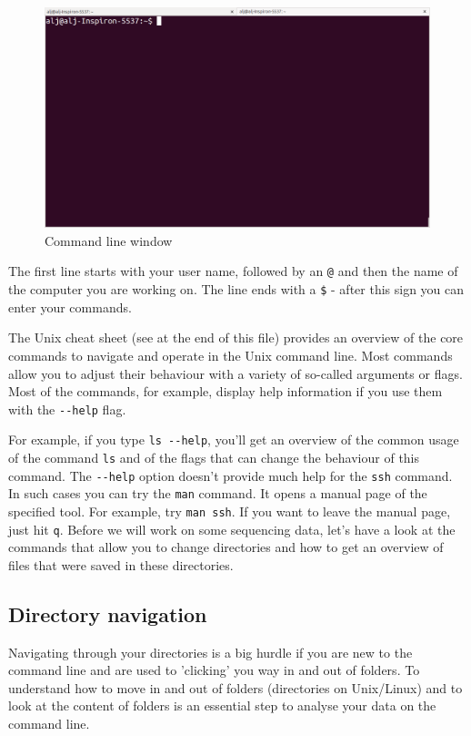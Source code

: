 \documentclass[11pt]{article}
\begin{document}
\begin{figure}[htb]
\centering
\includegraphics[width=14cm]{Terminal.png}
\caption{\label{fig:terminal}Command line window}
\end{figure}

The first line starts with your user name, followed by an \texttt{@} and then
the name of the computer you are working on. The line ends with a
\texttt{\$} - after this sign you can enter your commands.

The Unix cheat sheet (see at the end of this file) provides an
overview of the core commands to navigate and operate in the Unix
command line. Most commands allow you to adjust their behaviour with a
variety of so-called arguments or flags. Most of the commands, for
example, display help information if you use them with the \texttt{-{}-help}
flag.

For example, if you type \texttt{ls -{}-help}, you'll get an overview of the
common usage of the command \texttt{ls} and of the flags that can change the
behaviour of this command.  The \texttt{-{}-help} option doesn't provide much
help for the \texttt{ssh} command. In such cases you can try the \texttt{man}
command. It opens a manual page of the specified tool. For example,
try \texttt{man ssh}. If you want to leave the manual page, just hit \texttt{q}.
Before we will work on some sequencing data, let's have a look
at the commands that allow you to change directories and how to get an
overview of files that were saved in these directories.



\subsection{Directory navigation}
\label{sec-2-1}
Navigating through your directories is a big hurdle if you are new to
the command line and are used to 'clicking' you way in and out of folders. To
understand how to move in and out of folders (directories on Unix/Linux) and to look at the
content of folders is an essential step to analyse your data on
the command line.
\end{document}
